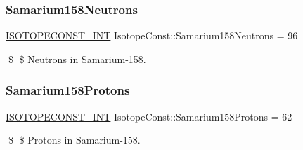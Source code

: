 \subsubsection{\texorpdfstring{Samarium158\+Neutrons}{Samarium158Neutrons}}
{\footnotesize\ttfamily \mbox{\hyperlink{group___isotope_const-_macros_ga5f18360b3e99483a35c32d789e62621c}{I\+S\+O\+T\+O\+P\+E\+C\+O\+N\+S\+T\+\_\+\+I\+NT}} Isotope\+Const\+::\+Samarium158\+Neutrons = 96}

\$ \$ Neutrons in Samarium-\/158. \mbox{\label{group___isotope_const-_samarium-_sm158_ga033c501cc7966a512b79cc43df67de79}} 
\subsubsection{\texorpdfstring{Samarium158\+Protons}{Samarium158Protons}}
{\footnotesize\ttfamily \mbox{\hyperlink{group___isotope_const-_macros_ga5f18360b3e99483a35c32d789e62621c}{I\+S\+O\+T\+O\+P\+E\+C\+O\+N\+S\+T\+\_\+\+I\+NT}} Isotope\+Const\+::\+Samarium158\+Protons = 62}

\$ \$ Protons in Samarium-\/158. 